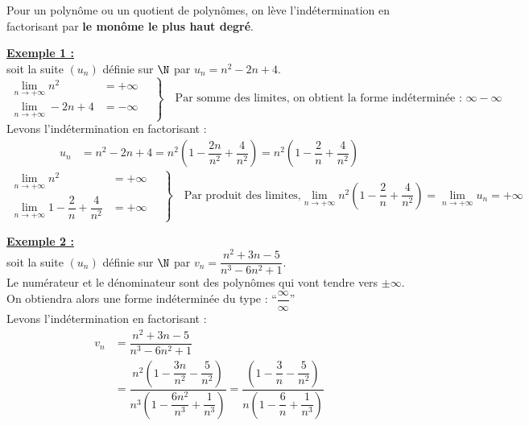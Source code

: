 \documentclass[11pt,twoside, openany]{extbook}
\begin{document}
\begin{tcolorbox}[colback= white, colframe=black!80, title= \section*{Méthode : Lever l’indétermination pour un polynôme}]
\begin{prop}[black][]
Pour un polynôme ou un quotient de polynômes, on lève l'indétermination en factorisant par \textbf{le monôme le plus haut degré}.
\end{prop}
\noindent \textbf{\ul{Exemple 1 :}}\\
soit la suite $(u_n)$ définie sur $\N$ par $u_n=n^2-2n+4$. 
\begin{equation*}
	\left.
	\begin{aligned}
		\lim\limits_{n \rightarrow +\infty} n^2 &= +\infty \quad \\
		\lim\limits_{n \rightarrow +\infty}  -2n+4 &= -\infty 
	\end{aligned}
	\right\}
	\quad \text{Par somme des limites, on obtient la forme indéterminée : $\infty-\infty$}
\end{equation*}
Levons l’indétermination en factorisant : 
\begin{align*}
    u_n&=n^2-2n+4 = n^2\left(1-\dfrac{2n}{n^2}+\dfrac{4}{n^2}\right)= n^2\left(1-\dfrac{2}{n}+\dfrac{4}{n^2}\right)
\end{align*}
\begin{equation*}
	\left.
	\begin{aligned}
		\lim\limits_{n \rightarrow +\infty} n^2 &= +\infty \quad \\
		\lim\limits_{n \rightarrow +\infty}  1-\dfrac{2}{n}+\dfrac{4}{n^2} &= +\infty
	\end{aligned}
	\right\}
	\quad \text{Par produit des limites,$\lim\limits_{n \rightarrow +\infty} n^2\left(1-\dfrac{2}{n}+\dfrac{4}{n^2}\right)=\lim\limits_{n \rightarrow +\infty}u_n=+\infty$}
\end{equation*}

 \noindent \textbf{\ul{Exemple 2 :}}\\
soit la suite $(u_n)$ définie sur $\N$ par $v_n=\dfrac{n^2+3n-5}{n^3-6n^2+1}$. \\
Le numérateur et le dénominateur sont des polynômes qui vont tendre vers $\pm\infty$.\\ On obtiendra alors une forme indéterminée du type : \enquote{$\dfrac{\infty}{\infty}$}\\
Levons l’indétermination en factorisant :\vspace{0.5em}
\begin{align*}
    v_n&=\dfrac{n^2+3n-5}{n^3-6n^2+1}\\&=\dfrac{n^2\left(1-\dfrac{3n}{n^2}-\dfrac{5}{n^2}\right)}{n^3\left(1-\dfrac{6n^2}{n^3}+\dfrac{1}{n^3}\right)} = \dfrac{\left(1-\dfrac{3}{n}-\dfrac{5}{n^2}\right)}{n\left(1-\dfrac{6}{n}+\dfrac{1}{n^3}\right)} 
\end{align*}


\end{tcolorbox}
\end{document}
